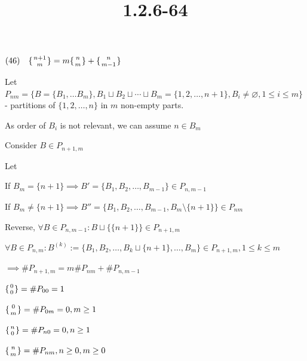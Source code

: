 \documentclass{article}
\title{1.2.6-64}
\begin{document}
\maketitle

\( (46)\quad \{{{n+1} \atop m}\} = m\{{{n} \atop m}\} + \{{{n} \atop m - 1}\} \)

Let \( P_{nm} = \{ B = \{ B_1, \ldots B_m \}, B_1\sqcup B_2\sqcup \cdots \sqcup B_m = \{ 1, 2, \ldots, n + 1 \}, B_i \neq \varnothing, 1 \leq i \leq m \} \) - partitions of \( \{ 1, 2, \ldots, n\} \) in \( m \) non-empty parts.

As order of \( B_i \) is not relevant, we can assume \( n \in B_m \)

Consider \( B \in P_{n+1,m} \)

Let

If \( B_m = \{ n + 1 \} \implies B' = \{ B_1, B_2, \ldots, B_{m-1} \} \in P_{n,m-1} \)

If \( B_m \neq \{ n + 1 \} \implies B'' = \{ B_1, B_2, \ldots, B_{m-1}, B_m \setminus \{ n + 1 \} \} \in P_{nm} \)

Reverse, \( \forall B \in P_{n, m-1}: B \sqcup \{ \{ n + 1 \} \} \in P_{n+1,m} \)

\( \forall B \in P_{n, m}: B^{(k)} := \{ B_1, B_2, \ldots, B_k \sqcup \{ n + 1 \}, \ldots, B_m \} \in P_{n+1,m}, 1 \leq k \leq m \)

\( \implies \#P_{n+1,m} = m \#P_{nm} + \#P_{n,m-1} \)

\( \{{0 \atop 0}\} = \#P_{00} = 1 \)

\( \{{0 \atop m}\} = \#P_{0m} = 0, m \geq 1 \)

\( \{{n \atop 0}\} = \#P_{n0} = 0, n \geq 1 \)

\( \{{n \atop m}\} = \#P_{nm}, n \geq 0, m \geq 0 \)
\end{document}
